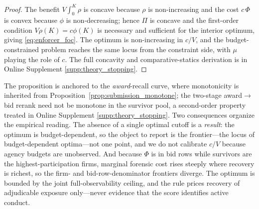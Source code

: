 \begin{proof}
The benefit $V\!\int_0^{K}\rho$ is concave because $\rho$ is
non-increasing and the cost $c\,\Phi$ is convex because $\phi$ is
non-decreasing; hence $\Pi$ is concave and the first-order condition
$V\rho(K)=c\phi(K)$ is necessary and sufficient for the interior optimum,
giving \eqref{eq:enforcer_foc}. The optimum is non-increasing in $c/V$,
and the budget-constrained problem reaches the same locus from the
constraint side, with $\mu$ playing the role of $c$. The full concavity
and comparative-statics derivation is in Online Supplement
\ref{supp:theory_stopping}.
\end{proof}

The proposition is anchored to the \emph{award}-recall curve, where
monotonicity is inherited from Proposition~\ref{prop:submission_monotone};
the two-stage award$\to$bid rerank need not be monotone in the survivor
pool, a second-order property treated in Online Supplement
\ref{supp:theory_stopping}. Two consequences organize the empirical
reading. The absence of a single optimal cutoff is a \emph{result}: the
optimum is budget-dependent, so the object to report is the
frontier---the locus of budget-dependent optima---not one point, and we
do not calibrate $c/V$ because agency budgets are unobserved. And
because $\Phi$ is in bid rows while survivors are the
highest-participation firms, marginal forensic cost rises steeply where
recovery is richest, so the firm- and bid-row-denominator frontiers
diverge. The optimum is bounded by the joint full-observability ceiling,
and the rule prices recovery of adjudicable exposure only---never
evidence that the score identifies active conduct.
